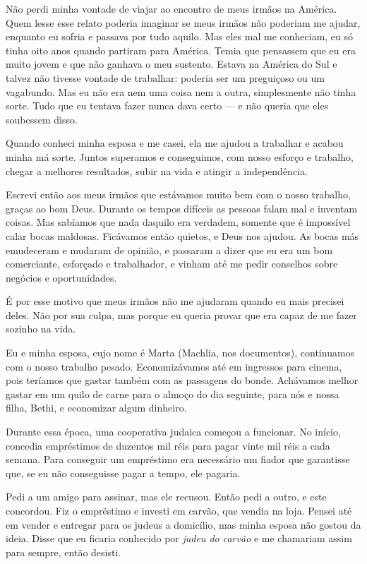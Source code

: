 Não perdi minha vontade de viajar ao encontro de meus irmãos
na América. Quem lesse esse relato poderia imaginar se meus irmãos não
poderiam me ajudar, enquanto eu sofria e passava por tudo aquilo. 
Mas eles mal me conheciam, eu só tinha oito anos quando partiram para América. 
Temia que pensassem que eu era muito jovem e que não ganhava o meu sustento. 
Estava na América do Sul e talvez não tivesse vontade de
trabalhar: poderia ser um preguiçoso ou um vagabundo. Mas eu não era nem uma coisa
nem a outra, simplesmente não tinha sorte. Tudo que eu tentava fazer
nunca dava certo --- e não queria que eles soubessem disso.

Quando conheci minha esposa e me casei, ela me ajudou a trabalhar e
acabou minha má sorte. Juntos superamos e conseguimos, com nosso
esforço e trabalho, chegar a melhores resultados, subir
na vida e atingir a independência.

Escrevi então aos meus irmãos que estávamos muito bem com o nosso
trabalho, graças ao bom Deus. Durante os tempos difíceis as
pessoas falam mal e inventam coisas. Mas sabíamos que
nada daquilo era verdadem, somente que é impossível calar bocas maldosas.
Ficávamos então quietos, e Deus nos ajudou. As bocas más emudeceram e mudaram
de opinião, e passaram a dizer que eu era um bom comerciante, esforçado e trabalhador,
e vinham até me pedir conselhos sobre negócios e oportunidades.

É por esse motivo que meus irmãos não me ajudaram quando
eu mais precisei deles. Não por sua culpa, mas porque eu queria
provar que era capaz de me fazer sozinho na vida.

Eu e minha esposa, cujo nome é Marta (Machlia, nos documentos), continuamos
com o nosso trabalho pesado. Economizávamos até em ingressos para cinema,
pois teríamos que gastar também com as passagens do bonde.
Achávamos melhor gastar em um quilo de carne para o almoço do dia
seguinte, para nós e nossa filha, Bethi, e economizar algum dinheiro.

Durante essa época, uma cooperativa judaica começou a funcionar. No início, 
concedia empréstimos de duzentos mil réis para pagar vinte mil réis a
cada semana. Para conseguir um empréstimo era necessário um fiador que garantisse que, 
se eu não conseguisse pagar a tempo, ele pagaria.

Pedi a um amigo para assinar, mas ele recusou. Então pedi a outro, e
este concordou. Fiz o empréstimo e investi em carvão, que vendia na loja.
Pensei até em vender e entregar para os judeus a domicílio, mas minha
esposa não gostou da ideia. Disse que eu ficaria conhecido por
\textit{judeu do carvão} e me chamariam assim para sempre, então desisti.

